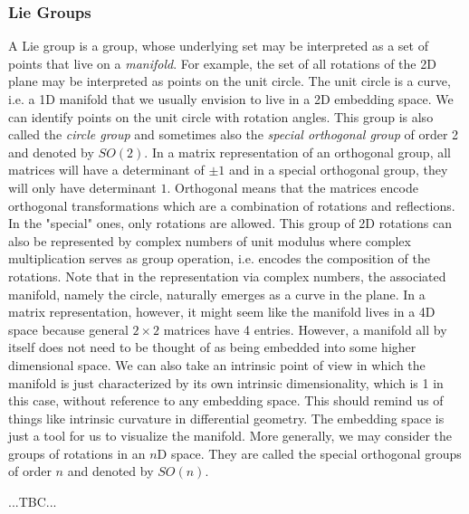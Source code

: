 \subsubsection{Lie Groups}
A Lie group is a group, whose underlying set may be interpreted as a set of points that live on a \emph{manifold}. For example, the set of all rotations of the 2D plane may be interpreted as points on the unit circle. The unit circle is a curve, i.e. a 1D manifold that we usually envision to live in a 2D embedding space. We can identify points on the unit circle with rotation angles. This group is also called the \emph{circle group} and sometimes also the \emph{special orthogonal group} of order 2 and denoted by $SO(2)$. In a matrix representation of an orthogonal group, all matrices will have a determinant of $\pm 1$ and in a special orthogonal group, they will only have determinant $1$. Orthogonal means that the matrices encode orthogonal transformations which are a combination of rotations and reflections. In the "special" ones, only rotations are allowed. This group of 2D rotations can also be represented by complex numbers of unit modulus where complex multiplication serves as group operation, i.e. encodes the composition of the rotations. Note that in the representation via complex numbers, the associated manifold, namely the circle, naturally emerges as a curve in the plane. In a matrix representation, however, it might seem like the manifold lives in a 4D space because general $2 \times 2$ matrices have 4 entries. However, a manifold all by itself does not need to be thought of as being embedded into some higher dimensional space. We can also take an intrinsic point of view in which the manifold is just characterized by its own intrinsic dimensionality, which is 1 in this case, without reference to any embedding space. This should remind us of things like intrinsic curvature in differential geometry. The embedding space is just a tool for us to visualize the manifold. More generally, we may consider the groups of rotations in an $n$D space. They are called the special orthogonal groups of order $n$ and denoted by $SO(n)$. 



...TBC...


